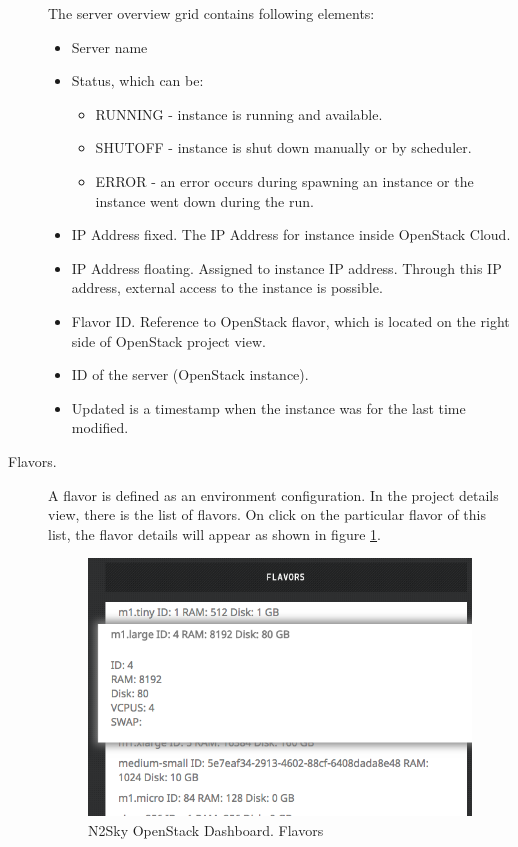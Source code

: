 \begin{description}
The server overview grid contains following elements:
\begin{itemize}
\item Server name 
\item Status, which can be: 
\begin{itemize}
\item RUNNING - instance is running and available. 
\item SHUTOFF - instance is shut down manually or by scheduler. 
\item ERROR - an error occurs during spawning an instance or the instance went down during the run.
\end{itemize}
\item IP Address fixed. The IP Address for instance inside OpenStack Cloud.
\item IP Address floating. Assigned to instance IP address. Through this IP address, external access to the instance is possible. 
\item Flavor ID. Reference to OpenStack flavor, which is located on the right side of OpenStack project view.
\item ID of the server (OpenStack instance).
\item Updated is a timestamp when the instance was for the last time modified. 
\end{itemize}
\item[Flavors.] A flavor is defined as an environment configuration. In the project details view, there is the list of flavors. On click on the particular flavor of this list, the flavor details will appear as shown in figure \ref{fig:openstack_flavors}.

 \begin{figure}[htbp]
\begin{center}
  \includegraphics[scale=0.5]{components/4/pics/openstack_flavors.png}
  \caption{N2Sky OpenStack Dashboard. Flavors}
  \label{fig:openstack_flavors}
\end{center}
\end{figure}


\end{description}
